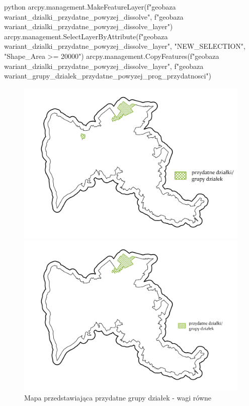 \documentclass{article}
\begin{document}
\begin{mintedbox}{python}
arcpy.management.MakeFeatureLayer(f"{geobaza}\\{wariant}_dzialki_przydatne_powyzej_dissolve", f"{geobaza}\\{wariant}_dzialki_przydatne_powyzej_dissolve_layer")
arcpy.management.SelectLayerByAttribute(f"{geobaza}\\{wariant}_dzialki_przydatne_powyzej_dissolve_layer", "NEW_SELECTION", "Shape_Area >= 20000")
arcpy.management.CopyFeatures(f"{geobaza}\\{wariant}_dzialki_przydatne_powyzej_dissolve_layer", f"{geobaza}\\{wariant}_grupy_dzialek_przydatne_powyzej_{prog_przydatnosci}")
\end{mintedbox}

\begin{figure}[H]
    \begin{minipage}[t]{0.48\textwidth}
        \centering
        \includegraphics[width=\linewidth]{img/przydatne-dzialki.jpg}
        \caption{Mapa przedstawiająca przydatne grupy działek - wagi równe}
        \label{fig:przydatne-dzialki-rowne}
    \end{minipage}
    \hfill
    \begin{minipage}[t]{0.48\textwidth}
        \centering
        \includegraphics[width=\linewidth]{img/roznewagi-przydatne-dzialki.jpg}

\end{minipage}
\end{figure}
\end{document}
